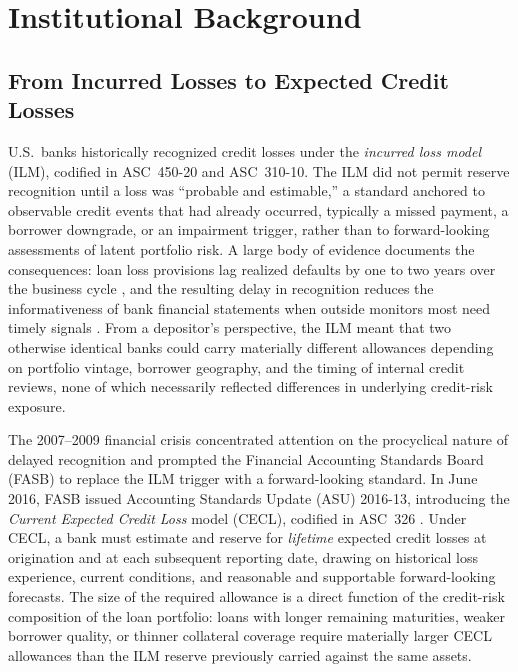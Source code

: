 
\section{Institutional Background}
\label{sec:background}

\subsection{From Incurred Losses to Expected Credit Losses}
\label{sec:background:transition}

U.S.\ banks historically recognized credit losses under the \textit{incurred
loss model} (ILM), codified in ASC~450-20 and ASC~310-10.  The ILM did not
permit reserve recognition until a loss was ``probable and estimable,'' a
standard anchored to observable credit events that had already occurred,
typically a missed payment, a borrower downgrade, or an impairment trigger,
rather than to forward-looking assessments of latent portfolio risk.  A large
body of evidence documents the consequences: loan loss provisions lag realized
defaults by one to two years over the business cycle
\citep{beatty2011delays}, and the resulting delay in recognition reduces the
informativeness of bank financial statements when outside monitors
most need timely signals \citep{bushman2012accounting, bushman2015delayed}.
From a depositor's perspective, the ILM meant that two otherwise identical
banks could carry materially different allowances depending on portfolio
vintage, borrower geography, and the timing of internal credit reviews, none
of which necessarily reflected differences in underlying credit-risk exposure.

The 2007--2009 financial crisis concentrated attention on the procyclical
nature of delayed recognition and prompted the Financial Accounting Standards
Board (FASB) to replace the ILM trigger with a forward-looking standard.  In
June 2016, FASB issued Accounting Standards Update (ASU) 2016-13, introducing
the \textit{Current Expected Credit Loss} model (CECL), codified in
ASC~326 \citep{FASB2016}.  Under CECL, a bank must estimate and reserve for
\textit{lifetime} expected credit losses at origination and at each subsequent
reporting date, drawing on historical loss experience, current conditions, and
reasonable and supportable forward-looking forecasts.  The size of the required
allowance is a direct function of the credit-risk composition of the loan
portfolio: loans with longer remaining maturities, weaker borrower quality, or
thinner collateral coverage require materially larger CECL allowances than the
ILM reserve previously carried against the same assets.

